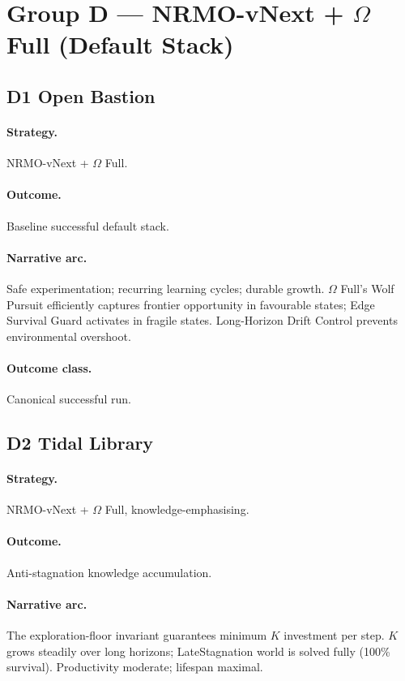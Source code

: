 \section{Group D --- NRMO-vNext + $\Omega$ Full (Default Stack)}
\label{sec:civ-group-d}

\subsection{D1 Open Bastion}
\label{civ:d1}

\paragraph{Strategy.} NRMO-vNext + $\Omega$ Full.
\paragraph{Outcome.} Baseline successful default stack.
\paragraph{Narrative arc.}
Safe experimentation; recurring learning cycles; durable
growth. $\Omega$ Full's Wolf Pursuit efficiently captures frontier
opportunity in favourable states; Edge Survival Guard activates in
fragile states. Long-Horizon Drift Control prevents environmental
overshoot.
\paragraph{Outcome class.} Canonical successful run.

\subsection{D2 Tidal Library}
\label{civ:d2}

\paragraph{Strategy.} NRMO-vNext + $\Omega$ Full,
knowledge-emphasising.
\paragraph{Outcome.} Anti-stagnation knowledge accumulation.
\paragraph{Narrative arc.}
The exploration-floor invariant guarantees minimum $K$
investment per step. $K$ grows steadily over long horizons;
LateStagnation world is solved fully (100\% survival). Productivity
moderate; lifespan maximal.
